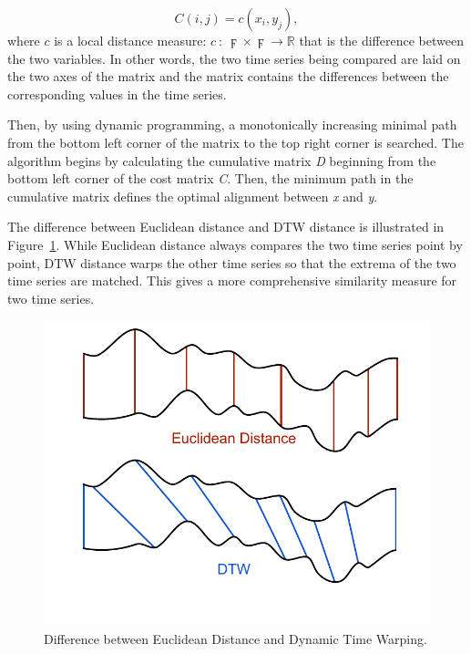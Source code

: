\begin{equation}
C(i, j) = c(x_i, y_j),
\end{equation}
where $c$ is a local distance measure: $c \ : \ \digamma \times \digamma \rightarrow \mathbb{R}$ that is the difference between the two variables. In other words, the two time series being compared are laid on the two axes of the matrix and the matrix contains the differences between the corresponding values in the time series.

Then, by using dynamic programming, a monotonically increasing minimal path from the bottom left corner of the matrix to the top right corner is searched. The algorithm begins by calculating the cumulative matrix \emph{D} beginning from the bottom left corner of the cost matrix \emph{C}. Then, the minimum path in the cumulative matrix defines the optimal alignment between \emph{x} and \emph{y}. \cite{Muller07} 

The difference between Euclidean distance and DTW distance is illustrated in Figure~\ref{fig:euclidean_vs_dtw}. While Euclidean distance always compares the two time series point by point, DTW distance warps the other time series so that the extrema of the two time series are matched. This gives a more comprehensive similarity measure for two time series.

\begin{figure}[here]
\centering
\includegraphics[scale=0.7]{images/euclidean_vs_dtw.pdf}
\caption{Difference between Euclidean Distance and Dynamic Time Warping.}
\label{fig:euclidean_vs_dtw}
\end{figure}



